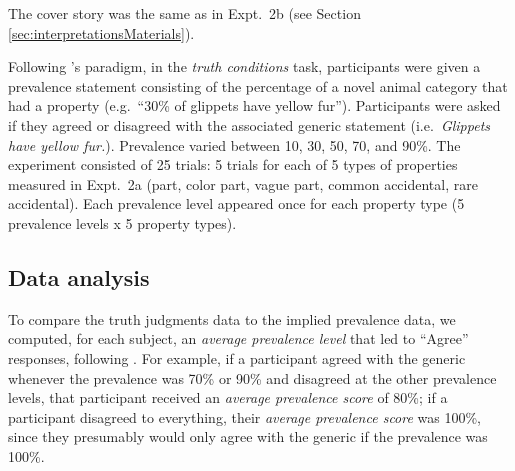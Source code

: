 \documentclass[10pt,letterpaper]{article}
\begin{document}
The cover story was the same as in Expt.~2b (see Section \ref{sec:interpretationsMaterials}).

Following \citeauthor{Cimpian2010}'s paradigm, in the \emph{truth conditions} task, participants were given a prevalence statement consisting of the percentage of a novel animal category that had a property (e.g.~``30\% of glippets have yellow fur''). 
Participants were asked if they agreed or disagreed with the associated generic statement (i.e.~\emph{Glippets have yellow fur.}).
Prevalence varied between 10, 30, 50, 70, and 90\%.
The experiment consisted of 25 trials: 5 trials for each of 5 types of properties measured in Expt.~2a (part, color part, vague part, common accidental, rare accidental). 
Each prevalence level appeared once for each property type (5 prevalence levels x 5 property types). 

\subsection{Data analysis}



To compare the truth judgments data to the implied prevalence data, we computed, for each subject, an \emph{average prevalence level} that led to ``Agree'' responses, following .
For example, if a participant agreed with the generic whenever the prevalence was 70\% or 90\% and disagreed at the other prevalence levels, that participant received an \emph{average prevalence score} of 80\%; if a participant disagreed to everything, their \emph{average prevalence score} was 100\%, since they presumably would only agree with the generic if the prevalence was 100\%.
\end{document}
